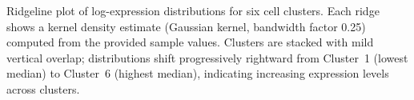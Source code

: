 \caption{Ridgeline plot of log-expression distributions for six cell clusters. Each ridge shows a kernel density estimate (Gaussian kernel, bandwidth factor 0.25) computed from the provided sample values. Clusters are stacked with mild vertical overlap; distributions shift progressively rightward from Cluster~1 (lowest median) to Cluster~6 (highest median), indicating increasing expression levels across clusters.}
